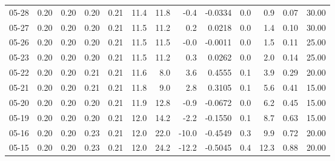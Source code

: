 \begin{threeparttable}
{\begin{tabular}{lrrrrrrrrrrrr}
  05-28 &          0.20 &          0.20 &          0.20 &        0.21 &                11.4 &                11.8 &       -0.4 &      -0.0334 &                 0.0 &              0.9 &            0.07 &                  30.00 \\
  05-27 &          0.20 &          0.20 &          0.20 &        0.21 &                11.5 &                11.2 &        0.2 &       0.0218 &                 0.0 &              1.4 &            0.10 &                  30.00 \\
  05-26 &          0.20 &          0.20 &          0.20 &        0.21 &                11.5 &                11.5 &       -0.0 &      -0.0011 &                 0.0 &              1.5 &            0.11 &                  25.00 \\
  05-23 &          0.20 &          0.20 &          0.20 &        0.21 &                11.5 &                11.2 &        0.3 &       0.0262 &                 0.0 &              2.0 &            0.14 &                  25.00 \\
  05-22 &          0.20 &          0.20 &          0.21 &        0.21 &                11.6 &                 8.0 &        3.6 &       0.4555 &                 0.1 &              3.9 &            0.29 &                  20.00 \\
  05-21 &          0.20 &          0.20 &          0.21 &        0.21 &                11.8 &                 9.0 &        2.8 &       0.3105 &                 0.1 &              5.6 &            0.41 &                  15.00 \\
  05-20 &          0.20 &          0.20 &          0.20 &        0.21 &                11.9 &                12.8 &       -0.9 &      -0.0672 &                 0.0 &              6.2 &            0.45 &                  15.00 \\
  05-19 &          0.20 &          0.20 &          0.20 &        0.21 &                12.0 &                14.2 &       -2.2 &      -0.1550 &                 0.1 &              8.7 &            0.63 &                  15.00 \\
  05-16 &          0.20 &          0.20 &          0.23 &        0.21 &                12.0 &                22.0 &      -10.0 &      -0.4549 &                 0.3 &              9.9 &            0.72 &                  20.00 \\
  05-15 &          0.20 &          0.20 &          0.23 &        0.21 &                12.0 &                24.2 &      -12.2 &      -0.5045 &                 0.4 &             12.3 &            0.88 &                  20.00 \\

\end{tabular}}
\end{threeparttable}
